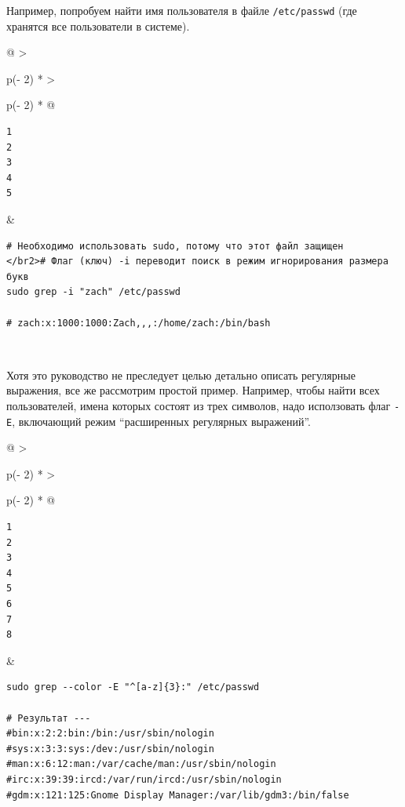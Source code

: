 \documentclass{report}
\begin{document}
Например, попробуем найти имя пользователя в файле \texttt{/etc/passwd}
(где хранятся все пользователи в системе).

\begin{longtable}[]{@{}
  >{\raggedright\arraybackslash}p{(\columnwidth - 2\tabcolsep) * }
  >{\raggedright\arraybackslash}p{(\columnwidth - 2\tabcolsep) * }@{}}
\toprule
\endhead
\begin{minipage}[t]{\linewidth}\raggedright
\begin{verbatim}
1
2
3
4
5
\end{verbatim}
\end{minipage} & \begin{minipage}[t]{\linewidth}\raggedright
\begin{verbatim}
# Необходимо использовать sudo, потому что этот файл защищен
</br2># Флаг (ключ) -i переводит поиск в режим игнорирования размера букв
sudo grep -i "zach" /etc/passwd

# zach:x:1000:1000:Zach,,,:/home/zach:/bin/bash
\end{verbatim}
\end{minipage} \\ \addlinespace
\bottomrule
\end{longtable}

Хотя это руководство не преследует целью детально описать регулярные
выражения, все же рассмотрим простой пример. Например, чтобы найти всех
пользователей, имена которых состоят из трех символов, надо исползовать
флаг \texttt{-E}, включающий режим ``расширенных регулярных выражений''.

\begin{longtable}[]{@{}
  >{\raggedright\arraybackslash}p{(\columnwidth - 2\tabcolsep) * }
  >{\raggedright\arraybackslash}p{(\columnwidth - 2\tabcolsep) * }@{}}
\toprule
\endhead
\begin{minipage}[t]{\linewidth}\raggedright
\begin{verbatim}
1
2
3
4
5
6
7
8
\end{verbatim}
\end{minipage} & \begin{minipage}[t]{\linewidth}\raggedright
\begin{verbatim}
sudo grep --color -E "^[a-z]{3}:" /etc/passwd

# Результат ---
#bin:x:2:2:bin:/bin:/usr/sbin/nologin
#sys:x:3:3:sys:/dev:/usr/sbin/nologin
#man:x:6:12:man:/var/cache/man:/usr/sbin/nologin
#irc:x:39:39:ircd:/var/run/ircd:/usr/sbin/nologin
#gdm:x:121:125:Gnome Display Manager:/var/lib/gdm3:/bin/false
\end{verbatim}
\end{minipage} \\ \addlinespace
\bottomrule
\end{longtable}
\end{document}

